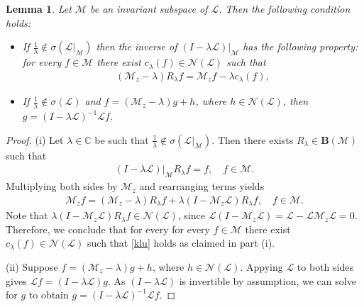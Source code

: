 \documentclass[reqno]{amsproc}
\numberwithin{equation}{section}
\newtheorem{lemma}[theorem]{Lemma}
\theoremstyle{remark}
\newcommand*{\mcal}{\mathcal{M}}
\newcommand*{\nul}{\mathscr{N}}
\theoremstyle{definition}
\newcommand{\lein}{\mathcal{L}}
\newcommand{\mul}{\mathcal{M}_z}
\begin{document}
\begin{lemma} Let $\mcal$ be an invariant subspace of $\lein$. Then the following condition holds{\em :}
\begin{itemize}
    \item[(i)]
    If $\frac{1}{\lambda}\notin\sigma(\lein|_\mcal)$ then the inverse of $(I-\lambda\lein)|_\mcal$ has the following property{\em :} for every $f\in \mcal$ there exist $c_\lambda(f)\in \nul(\lein)$ such that
    \begin{align}\label{klu}
         (\mul-\lambda)R_\lambda f=\mul f-\lambda c_\lambda(f),
    \end{align}
    \item[(ii)] If  $\frac{1}{\lambda}\notin\sigma(\lein)$ and $f=(\mul-\lambda)g+h$, where $h\in \nul(\lein)$,  then $g=(I-\lambda\lein)^{-1}\lein f$.
    \end{itemize}
\end{lemma}
\begin{proof}
(i)
Let $\lambda\in \mathbb{C}$ be such that $\frac{1}{\lambda}\notin \sigma(\lein|_\mcal)$. Then there exists $R_\lambda\in \boldsymbol{B}(\mcal)$ such that
\begin{align*}
    (I-\lambda\lein)|_\mcal R_\lambda f=f,\quad f\in \mcal.
\end{align*}
Multiplying both sides by $\mul$ and rearranging terms yields
\begin{align*}
    \mul f= (\mul-\lambda)R_\lambda f+\lambda(I-\mul\lein)R_\lambda f,\quad f\in \mcal.
\end{align*}
Note that $\lambda(I-\mul\lein)R_\lambda f\in \nul(\lein)$, since $\lein(I-\mul\lein)=\lein-\lein\mul\lein=0$.
Therefore, we conclude that for every for every $f\in \mcal$ there exist $c_\lambda(f)\in \nul(\lein)$ such that \eqref{klu} holds as claimed in part (i).

(ii) Suppose $f=(\mul-\lambda)g+h$, where $h\in \nul(\lein)$. Appying $\lein$ to both sides gives $\lein f=(I-\lambda\lein)g$. As $(I-\lambda\lein)$ is invertible by assumption, we can solve for $g$
to obtain $g=(I-\lambda\lein)^{-1}\lein f$.
\end{proof}
\end{document}
